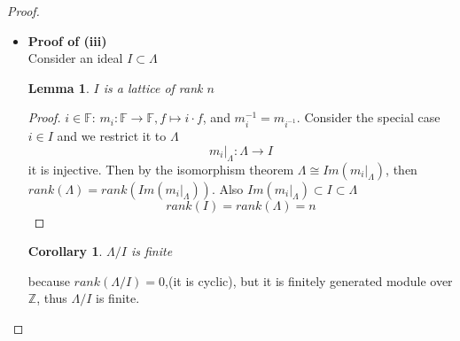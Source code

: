 \documentclass[11pt]{article}
\newtheorem{lemma}[thm]{Lemma}
\newtheorem{cor}[thm]{Corollary}
\newcommand{\intg}{\mathbb Z}
\newcommand{\bbf}{\mathbb F}
\newcommand{\ratl}{\mathbb Q}
\newcommand{\rta}{\rightarrow}
\newcommand{\lrta}{\longrightarrow}
\begin{document}
\begin{proof}
\begin{itemize}
	In the case of separable extension of degree $n$. There are exactly $n$ distinct field embeddings $\sigma_1,...,\sigma_n$, fixing $\ratl$, from $\bbf$ into a Galois extension $\bbf'$ of $\ratl$ containing $\bbf$. If $\sigma\in Aut(\bbf'/\ratl)$, then $\sigma \sigma_1,...,\sigma\sigma_n$ is a permutation of $\sigma_1,...,\sigma_n$; so for each $f\in \bbf$,
	$$
	tr_{\bbf/\ratl}(f)=\sigma_1(f)+...+\sigma_n(f)
	$$
	lies in the fixed field $\ratl$. So the trace map $tr_{\bbf/\ratl}$ is $\ratl$-linear. By linear independence of characters, $\sigma_1,...,\sigma_n\neq0$; so trace is surjective. (For detailed construction see GTM 211 p285)

	\textbf{Claim $tr_{\bbf/\ratl}(\Lambda)=\intg$}
	because the trace map is $\ratl$-linear, it maps algebraic integers in $\bbf$ to algebraic integers in $\ratl$, which is just $\intg$

	\[
	\begin{tikzcd}
	\bbf\ar[r, two heads,"tr_{\bbf/\ratl}"] & \ratl \\
	\Lambda \ar[r,two heads,"tr_{\bbf/\ratl}"]\ar[u,hook] & \intg \ar[u,hook].
	\end{tikzcd}
	\]
 
	Choose $\lambda_1,...,\lambda_n$ basis of $\bbf$ over $\ratl$, (as $\ratl$-vector space). W.l.o.g. $\lambda_i\in \Lambda$ (by the Lemma~\ref{lem:multiply_by_m})
	define: $T:\bbf\lrta \ratl^n$ and $T:f\mapsto(tr_{\bbf/\ratl}(\lambda_1 f),...,tr_{\bbf/\ratl}(\lambda_n f))$. Then the $\ratl$-linear function is bijective, and embeds $\Lambda$ in the direct sum  $\intg\oplus...\oplus \intg$. \[
	\begin{tikzcd}
	\bbf\ar[r,"T\ \cong"] & \ratl^n \\
	\Lambda \ar[r,hook,"T"]\ar[u,hook] & \intg^n \ar[u,hook].
	\end{tikzcd}
	\]
	Therefore, $\Lambda$ is a finitely generated additive group of rank $n$.
\item \textbf{Proof of (iii)}\\
	Consider an ideal $I\subset \Lambda$
	\begin{lemma}
	$I$ is a lattice of rank $n$
	\end{lemma}
	\begin{proof}
	 $i\in \bbf$: $m_i:\bbf\rta\bbf,f\mapsto i\cdot f$, and $m_{i}^{-1}=m_{i^{-1}}$. Consider the special case $i\in I$ and we restrict it to $\Lambda$
	 $$
	 m_i|_\Lambda: \Lambda\lrta I 
	 $$
	 it is injective. Then by the isomorphism theorem
	 $\Lambda\cong Im(m_i|_\Lambda)$, then $rank(\Lambda)=rank(Im(m_i|_\Lambda))$.
	 Also $Im(m_i|_\Lambda)\subset I\subset \Lambda$
	 $$
	rank(I)=rank(\Lambda)=n
	 $$
	\end{proof}
	\begin{cor}
	$\Lambda/I$ is finite
	\end{cor}
	because $rank(\Lambda/I)=0$,(it is cyclic), but it is finitely generated module over $\intg$, thus $\Lambda/I$ is finite. 


\end{itemize}
\end{proof}
\end{document}
